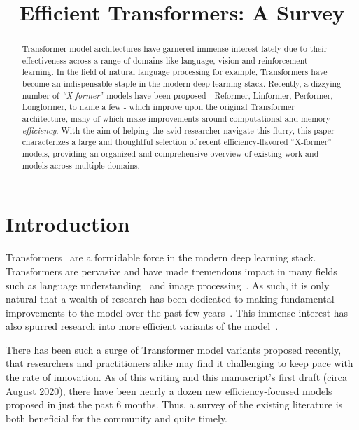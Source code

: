 \title{Efficient Transformers: A Survey}

\begin{abstract}
Transformer model architectures have garnered immense interest lately due to their effectiveness across a range of domains like language, vision and reinforcement learning. In the field of natural language processing for example, Transformers have become an indispensable staple in the modern deep learning stack. Recently, a dizzying number of \emph{``X-former''} models have been proposed - Reformer, Linformer, Performer, Longformer, to name a few - which improve upon the original Transformer architecture, many of which make improvements around computational and memory \emph{efficiency}. With the aim of helping the avid researcher navigate this flurry, this paper characterizes a large and thoughtful selection of recent efficiency-flavored ``X-former'' models, providing an organized and comprehensive overview of existing work and models across multiple domains.
\end{abstract}

\section{Introduction}
Transformers~\citep{vaswani2017attention} are a formidable force in the modern deep learning stack. Transformers are pervasive and have made tremendous impact in many fields such as language understanding~\citep{devlin2018bert,brown2020language,raffel2019exploring} and image processing~\citep{parmar2018image,carion2020end}. As such, it is only natural that a wealth of research has been dedicated to making fundamental improvements to the model over the past few years~\citep{dehghani2018universal,so2019evolved,ahmed2017weighted}. This immense interest has also spurred research into more efficient variants of the model~\citep{kitaev2020reformer,roy2020efficient,beltagy2020longformer,katharopoulos2020transformers,tay2020sparse,wang2020linformer,rae2020compressive,choromanski2020rethinking,dai2020funnel,correia2019adaptively, sukhbaatar2019adaptive, vyas2020fast}.

There has been such a surge of Transformer model variants proposed recently, that researchers and practitioners alike may find it challenging to keep pace with the rate of innovation. As of this writing and this manuscript's first draft (circa August 2020), there have been nearly a dozen new efficiency-focused models proposed in just the past 6 months. Thus, a survey of the existing literature is both beneficial for the community and quite timely.

